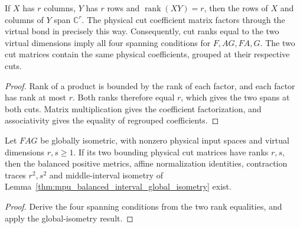 \begin{lemma}
    \label{thm:mpu_minimal_cut_ranks_spanning_caps}
    \leanok
    If $X$ has $r$ columns, $Y$ has $r$ rows and
    $\operatorname{rank}(XY)=r$, then the rows of $X$ and columns
    of $Y$ span $\mathbb C^r$. The physical cut coefficient matrix
    factors through the virtual bond in precisely this way.
    Consequently, cut ranks equal to the two virtual dimensions
    imply all four spanning conditions for $F,AG,FA,G$.
    The two cut matrices contain the same physical coefficients,
    grouped at their respective cuts.
\end{lemma}
\begin{proof}\leanok
    Rank of a product is bounded by the rank of each factor, and
    each factor has rank at most $r$. Both ranks therefore equal
    $r$, which gives the two spans at both cuts.
    Matrix multiplication gives the coefficient factorization,
    and associativity gives the equality of regrouped coefficients.
\end{proof}

\begin{lemma}
    \label{thm:mpu_balanced_interval_minimal_cut_ranks}
    \leanok
    Let $FAG$ be globally isometric, with nonzero physical input
    spaces and virtual dimensions $r,s\geq1$. If its two bounding
    physical cut matrices have ranks $r,s$, then the balanced
    positive metrics, affine normalization identities, contraction
    traces $r^2,s^2$ and middle-interval isometry of
    Lemma~\ref{thm:mpu_balanced_interval_global_isometry} exist.
\end{lemma}
\begin{proof}\leanok
    Derive the four spanning conditions from the two rank equalities,
    and apply the global-isometry result.
\end{proof}

